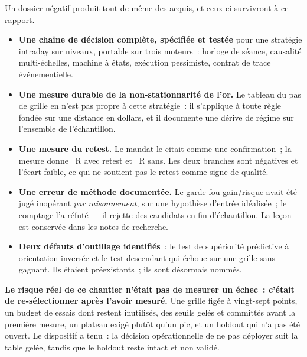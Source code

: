 Un dossier négatif produit tout de même des acquis, et ceux-ci survivront à ce
rapport.

\begin{itemize}
  \item \textbf{Une chaîne de décision complète, spécifiée et testée} pour une
  stratégie intraday sur niveaux, portable sur trois moteurs~: horloge de
  séance, causalité multi-échelles, machine à états, exécution pessimiste,
  contrat de trace événementielle.

  \item \textbf{Une mesure durable de la non-stationnarité de l'or.} Le
  tableau du pas de grille en  n'est pas propre à cette stratégie~:
  il s'applique à toute règle fondée sur une distance en dollars, et il
  documente une dérive de régime sur l'ensemble de l'échantillon.

  \item \textbf{Une mesure du retest.} Le mandat le citait comme une
  confirmation~; la mesure donne \XTenRetestR{}~R avec retest et
  \XTenNoRetestR{}~R sans. Les deux branches sont négatives et l'écart faible,
  ce qui ne soutient pas le retest comme signe de qualité.

  \item \textbf{Une erreur de méthode documentée.} Le garde-fou gain/risque
  avait été jugé inopérant \emph{par raisonnement}, sur une hypothèse
  d'entrée idéalisée~; le comptage l'a réfuté --- il rejette
  \XTenRRejectLastYear{} des candidats en fin d'échantillon. La leçon est
  conservée dans les notes de recherche.

  \item \textbf{Deux défauts d'outillage identifiés}~: le test de supériorité
  prédictive à orientation inversée et le test descendant qui échoue sur une
  grille sans gagnant. Ils étaient préexistants~; ils sont désormais nommés.
\end{itemize}

\begin{insightbox}
\textbf{Le risque réel de ce chantier n'était pas de mesurer un échec~: c'était
de re-sélectionner après l'avoir mesuré.} Une grille figée à vingt-sept
points, un budget de \XTenTrialsCeiling{} essais dont \XTenTrialsReserve{}
restent inutilisés, des seuils gelés et committés avant la première mesure, un
plateau exigé plutôt qu'un pic, et un holdout qui n'a pas été ouvert. Le
dispositif a tenu~: la décision opérationnelle de ne pas déployer suit la
table gelée, tandis que le holdout reste intact et non validé.
\end{insightbox}
